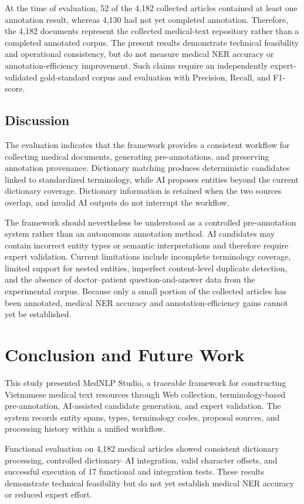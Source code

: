 \documentclass[runningheads]{llncs}
\begin{document}
At the time of evaluation, 52 of the 4,182 collected articles contained at least one annotation result, whereas 4,130 had not yet completed annotation. Therefore, the 4,182 documents represent the collected medical-text repository rather than a completed annotated corpus. The present results demonstrate technical feasibility and operational consistency, but do not measure medical NER accuracy or annotation-efficiency improvement. Such claims require an independently expert-validated gold-standard corpus and evaluation with Precision, Recall, and F1-score.

\subsection{Discussion}
The evaluation indicates that the framework provides a consistent workflow for collecting medical documents, generating pre-annotations, and preserving annotation provenance. Dictionary matching produces deterministic candidates linked to standardized terminology, while AI proposes entities beyond the current dictionary coverage. Dictionary information is retained when the two sources overlap, and invalid AI outputs do not interrupt the workflow.

The framework should nevertheless be understood as a controlled pre-annotation system rather than an autonomous annotation method. AI candidates may contain incorrect entity types or semantic interpretations and therefore require expert validation. Current limitations include incomplete terminology coverage, limited support for nested entities, imperfect content-level duplicate detection, and the absence of doctor--patient question-and-answer data from the experimental corpus. Because only a small portion of the collected articles has been annotated, medical NER accuracy and annotation-efficiency gains cannot yet be established.

\section{Conclusion and Future Work}
This study presented MedNLP Studio, a traceable framework for constructing Vietnamese medical text resources through Web collection, terminology-based pre-annotation, AI-assisted candidate generation, and expert validation. The system records entity spans, types, terminology codes, proposal sources, and processing history within a unified workflow.

Functional evaluation on 4,182 medical articles showed consistent dictionary processing, controlled dictionary--AI integration, valid character offsets, and successful execution of 17 functional and integration tests. These results demonstrate technical feasibility but do not yet establish medical NER accuracy or reduced expert effort.
\end{document}

